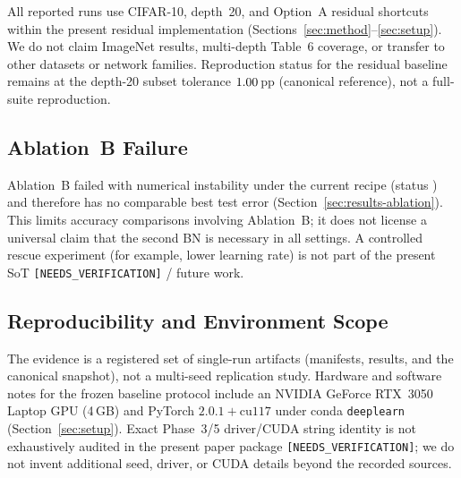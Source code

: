 All reported runs use CIFAR-10, depth~20, and Option~A residual shortcuts within the
present residual implementation (Sections~\ref{sec:method}--\ref{sec:setup}).
We do not claim ImageNet results, multi-depth Table~6 coverage, or transfer to other
datasets or network families.
Reproduction status for the residual baseline remains \ReproStatus at the depth-20 subset
tolerance $1.00$\,pp (canonical reference), not a full-suite reproduction.

\subsection{Ablation~B Failure}
\label{sec:lim-ablation-b}

Ablation~B failed with numerical instability under the current recipe
(status \AblationBStatus) and therefore has no comparable best test error
(Section~\ref{sec:results-ablation}).
This limits accuracy comparisons involving Ablation~B; it does not license a universal claim
that the second BN is necessary in all settings.
A controlled rescue experiment (for example, lower learning rate) is not part of the present
SoT
\texttt{[NEEDS\_VERIFICATION]} / future work.

\subsection{Reproducibility and Environment Scope}
\label{sec:lim-env}

The evidence is a registered set of single-run artifacts (manifests, results, and the
canonical snapshot), not a multi-seed replication study.
Hardware and software notes for the frozen baseline protocol include an
NVIDIA GeForce RTX~3050 Laptop GPU (4\,GB) and PyTorch $2.0.1{+}\mathrm{cu117}$ under
conda \texttt{deeplearn} (Section~\ref{sec:setup}).
Exact Phase~3/5 driver/CUDA string identity is not exhaustively audited in the present paper
package
\texttt{[NEEDS\_VERIFICATION]};
we do not invent additional seed, driver, or CUDA details beyond the recorded sources.
